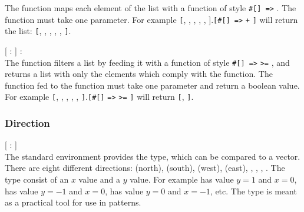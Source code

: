 \begin{dlist}
    The  function maps each element of the list with a function of
    style \texttt{\#[}\texttt{] =>} . The function must
    take one parameter.  For example \texttt{[}, ,
    , , ,
    ].\texttt{[\#[}\texttt{] =>}
     \texttt{+} \texttt{]} will return the list:
    \texttt{[}, , , , ,
    \texttt{]}.
  \item {}[ : ] :  \\
    The  function filters a list by feeding it with a function
    of style \texttt{\#[}\texttt{] =>}  \texttt{>=}
    , and returns a list with only the elements which comply with the
    function. The function fed to the  function must take one
    parameter and return a boolean value. For example \texttt{[},
    , , , ,
    \texttt{]}.\texttt{[\#[}\texttt{]}
    \texttt{=>}  \texttt{>=} \texttt{]} will return
    \texttt{[}, \texttt{]}. 
\end{dlist}

\subsubsection{Direction}
\begin{dlist}
  \item {}[ : ]\\
    The standard environment provides the  type, which can be
    compared to a vector. There are eight different directions: 
    (north),  (south),  (west), 
    (east), , , , .
    The type consist of an $x$ value and a $y$ value. For example 
    has value $y = 1$ and $x = 0$,  has value $y = -1$ and $x =
    0$,  has value $y = 0$ and $x = -1$, etc. The 
    type is meant as a practical tool for use in patterns. 
\end{dlist}

